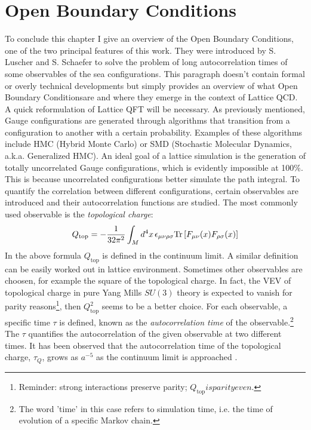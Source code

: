 \documentclass[english, LaM, oneside, noexaminfo]{sapthesis}
\newcommand{\obc}{Open Boundary Conditions}
\newcommand{\tr}{\text{Tr}}
\begin{document}
\section{\obc}\label{sec:obc}
\noindent
To conclude this chapter I give an overview of the \obc, one of the two principal features of this work.
They were introduced by S. Luscher and S. Schaefer \cite{OBC_top} to solve the problem of long autocorrelation times of some observables of the sea configurations.
This paragraph doesn't contain formal or overly technical developments but simply provides an overview of what \obc\space are and where they emerge in the context of Lattice QCD.
A quick reformulation of Lattice QFT will be necessary.
\newline
As previously mentioned, Gauge configurations are generated through algorithms that transition from a configuration to another with a certain probability.
Examples of these algorithms include HMC (Hybrid Monte Carlo) or SMD (Stochastic Molecular Dynamics, a.k.a. Generalized HMC).
An ideal goal of a lattice simulation is the generation of totally uncorrelated Gauge configurations, which is evidently impossible at 100\%.
This is because uncorrelated configurations better simulate the path integral.
To quantify the correlation between different configurations, certain observables are introduced and their autocorrelation functions are studied.
The most commonly used observable is the {\it topological charge}:
\begin{equation*}
    Q_\text{top} = -\frac{1}{32\pi^2}\int_M d^4x \hspace*{.5mm} \epsilon_{\mu\nu\rho\sigma} \tr \left[F_{\mu\nu}(x) F_{\rho\sigma}(x)\right]
\end{equation*}
In the above formula $Q_\text{top}$ is defined in the continuum limit.
A similar definition can be easily worked out in lattice environment.
Sometimes other observables are choosen, for example the square of the topological charge.
In fact, the VEV of topological charge in pure Yang Mills $SU(3)$ theory is expected to vanish for parity reasons\footnote{Reminder: strong interactions preserve parity; $Q_\text{top} is parity even.$}, then $Q_\text{top}^2$ seems to be a better choice.
For each observable, a specific time $\tau$ is defined, known as the {\it autocorrelation time} of the observable.\footnote{The word 'time' in this case refers to simulation time, i.e. the time of evolution of a specific Markov chain.}
The $\tau$ quantifies the autocorrelation of the given observable at two different times.
It has been observed that the autocorrelation time of the topological charge, $\tau_Q$, grows as $a^{-5}$ as the continuum limit is approached \cite{Topology-WilsonFlow-HMC}.
\end{document}
